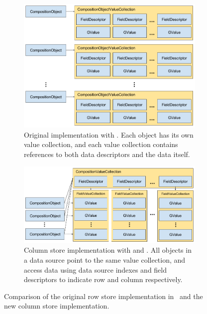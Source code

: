 \begin{figure}
    \centering
    \begin{subfigure}{1.0\textwidth}
        \includegraphics[width=\textwidth]{img/gap-original-rows.png}
        \caption{Original implementation with . Each object has its own value collection, and each value collection contains references to both data descriptors and the data itself.}
        \label{fig:gap-original-rows}
    \end{subfigure}
    \begin{subfigure}{1.0\textwidth}
        \includegraphics[width=\textwidth]{img/gap-bb-columns.png}
        \caption{Column store implementation with  and . All objects in a data source point to the same value collection, and access data using data source indexes and field descriptors to indicate row and column respectively.}
        \label{fig:gap-bb-columns}
    \end{subfigure}
    \caption{Comparison of the original row store implementation in \gap~and the new column store implementation.}
    \label{fig:gap-storage-comparison}
\end{figure}

